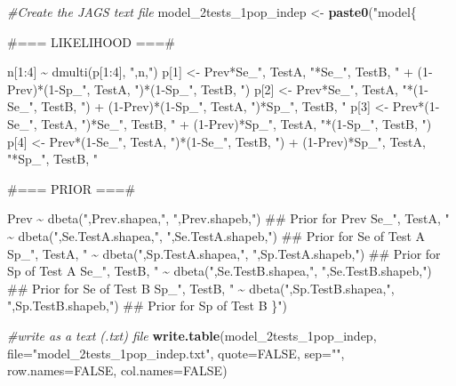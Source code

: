 \documentclass[
]{book}
\newenvironment{Shaded}{\begin{snugshade}}{\end{snugshade}}
\newcommand{\AttributeTok}[1]{\textcolor[rgb]{0.13,0.29,0.53}{#1}}
\newcommand{\CommentTok}[1]{\textcolor[rgb]{0.56,0.35,0.01}{\textit{#1}}}
\newcommand{\ConstantTok}[1]{\textcolor[rgb]{0.56,0.35,0.01}{#1}}
\newcommand{\FunctionTok}[1]{\textcolor[rgb]{0.13,0.29,0.53}{\textbf{#1}}}
\newcommand{\NormalTok}[1]{#1}
\newcommand{\OtherTok}[1]{\textcolor[rgb]{0.56,0.35,0.01}{#1}}
\newcommand{\StringTok}[1]{\textcolor[rgb]{0.31,0.60,0.02}{#1}}
\begin{document}
\begin{Shaded}
\begin{Highlighting}[]
\CommentTok{\#Create the JAGS text file}
\NormalTok{model\_2tests\_1pop\_indep }\OtherTok{\textless{}{-}} \FunctionTok{paste0}\NormalTok{(}\StringTok{"model\{}

\StringTok{\#=== LIKELIHOOD ===\#}

\StringTok{  n[1:4] \textasciitilde{} dmulti(p[1:4], "}\NormalTok{,n,}\StringTok{")}
\StringTok{  p[1] \textless{}{-} Prev*Se\_"}\NormalTok{, TestA, }\StringTok{"*Se\_"}\NormalTok{, TestB, }\StringTok{" + (1{-}Prev)*(1{-}Sp\_"}\NormalTok{, TestA, }\StringTok{")*(1{-}Sp\_"}\NormalTok{, TestB, }\StringTok{")}
\StringTok{  p[2] \textless{}{-} Prev*Se\_"}\NormalTok{, TestA, }\StringTok{"*(1{-}Se\_"}\NormalTok{, TestB, }\StringTok{") + (1{-}Prev)*(1{-}Sp\_"}\NormalTok{, TestA, }\StringTok{")*Sp\_"}\NormalTok{, TestB, }\StringTok{"}
\StringTok{  p[3] \textless{}{-} Prev*(1{-}Se\_"}\NormalTok{, TestA, }\StringTok{")*Se\_"}\NormalTok{, TestB, }\StringTok{" + (1{-}Prev)*Sp\_"}\NormalTok{, TestA, }\StringTok{"*(1{-}Sp\_"}\NormalTok{, TestB, }\StringTok{")}
\StringTok{  p[4] \textless{}{-} Prev*(1{-}Se\_"}\NormalTok{, TestA, }\StringTok{")*(1{-}Se\_"}\NormalTok{, TestB, }\StringTok{") + (1{-}Prev)*Sp\_"}\NormalTok{, TestA, }\StringTok{"*Sp\_"}\NormalTok{, TestB, }\StringTok{"}

\StringTok{\#=== PRIOR  ===\#}

\StringTok{  Prev \textasciitilde{} dbeta("}\NormalTok{,Prev.shapea,}\StringTok{", "}\NormalTok{,Prev.shapeb,}\StringTok{")    \#\# Prior for Prev}
\StringTok{  Se\_"}\NormalTok{, TestA, }\StringTok{" \textasciitilde{} dbeta("}\NormalTok{,Se.TestA.shapea,}\StringTok{", "}\NormalTok{,Se.TestA.shapeb,}\StringTok{")  \#\# Prior for Se of Test A}
\StringTok{  Sp\_"}\NormalTok{, TestA, }\StringTok{" \textasciitilde{} dbeta("}\NormalTok{,Sp.TestA.shapea,}\StringTok{", "}\NormalTok{,Sp.TestA.shapeb,}\StringTok{")  \#\# Prior for Sp of Test A}
\StringTok{  Se\_"}\NormalTok{, TestB, }\StringTok{" \textasciitilde{} dbeta("}\NormalTok{,Se.TestB.shapea,}\StringTok{", "}\NormalTok{,Se.TestB.shapeb,}\StringTok{")  \#\# Prior for Se of Test B}
\StringTok{  Sp\_"}\NormalTok{, TestB, }\StringTok{" \textasciitilde{} dbeta("}\NormalTok{,Sp.TestB.shapea,}\StringTok{", "}\NormalTok{,Sp.TestB.shapeb,}\StringTok{")  \#\# Prior for Sp of Test B}
\StringTok{  }
\StringTok{\}"}\NormalTok{)}

\CommentTok{\#write as a text (.txt) file}
\FunctionTok{write.table}\NormalTok{(model\_2tests\_1pop\_indep, }
            \AttributeTok{file=}\StringTok{"model\_2tests\_1pop\_indep.txt"}\NormalTok{, }
            \AttributeTok{quote=}\ConstantTok{FALSE}\NormalTok{, }
            \AttributeTok{sep=}\StringTok{""}\NormalTok{, }
            \AttributeTok{row.names=}\ConstantTok{FALSE}\NormalTok{,}
            \AttributeTok{col.names=}\ConstantTok{FALSE}\NormalTok{)}
\end{Highlighting}
\end{Shaded}
\end{document}
